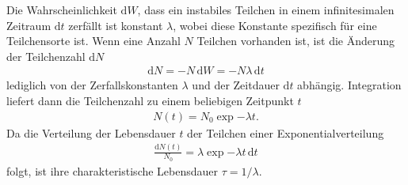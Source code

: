 Die Wahrscheinlichkeit $\text{d}W$, dass ein instabiles Teilchen in einem infinitesimalen Zeitraum $\text{d}t$ zerfällt ist konstant $\lambda$, wobei diese Konstante spezifisch für eine Teilchensorte ist. Wenn eine Anzahl $N$ Teilchen vorhanden ist, ist die Änderung der Teilchenzahl $\text{d}N$
\begin{align}
	\text{d}N = -N\,\text{d}W = -N\lambda\,\text{d}t
\end{align}
lediglich von der Zerfallskonstanten $\lambda$ und der Zeitdauer $\text{d}t$ abhängig. Integration liefert dann die Teilchenzahl zu einem beliebigen Zeitpunkt $t$
\begin{align}
	N(t) = N_0 \exp{-\lambda t}.
\end{align}
Da die Verteilung der Lebensdauer $t$ der Teilchen einer Exponentialverteilung
\begin{align}
	\frac{\text{d}N(t)}{N_0} = \lambda \exp{-\lambda t}\,\text{d}t
\end{align}
folgt, ist ihre charakteristische Lebensdauer $\tau = 1/\lambda$.
